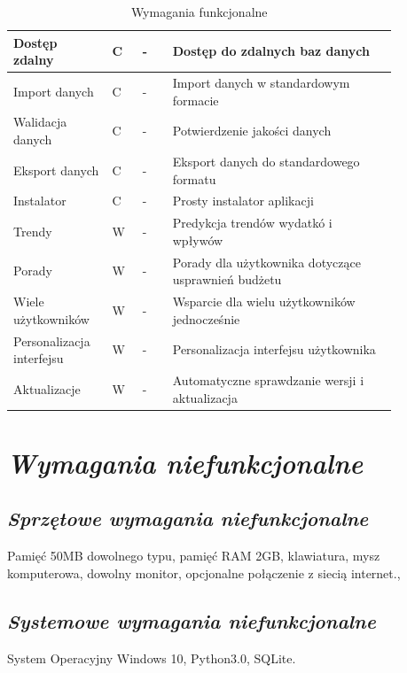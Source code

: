 \documentclass[a4paper,10pt]{report}
\newcommand{\customstylechapter}[1]{\large{\textit{#1}}}
\newcommand{\customstylesection}[1]{\textbf{\textit{#1}}}
\begin{document}
\begin{table}[h]
\begin{tabular}{|p{0.2\linewidth}|p{0.07\linewidth}|p{0.07\linewidth}|p{0.52\linewidth}|}
    \hline
    {Dostęp zdalny} & {C} & {-} & {Dostęp do zdalnych baz danych}\\
    \hline
    {Import danych} & {C} & {-} & {Import danych w standardowym formacie}\\
    \hline
    {Walidacja danych} & {C} & {-} & {Potwierdzenie jakości danych}\\
    \hline
    {Eksport danych} & {C} & {-} & {Eksport danych do standardowego formatu}\\
    \hline
    {Instalator} & {C} & {-} & {Prosty instalator aplikacji}\\
    \hline
    {Trendy} & {W} & {-} & {Predykcja trendów wydatkó i wpływów}\\
    \hline
    {Porady} & {W} & {-} & {Porady dla użytkownika dotyczące usprawnień budżetu}\\
    \hline
    {Wiele użytkowników} & {W} & {-} & {Wsparcie dla wielu użytkowników jednocześnie}\\
    \hline
    {Personalizacja interfejsu} & {W} & {-} & {Personalizacja interfejsu użytkownika}\\
    \hline
    {Aktualizacje} & {W} & {-} & {Automatyczne sprawdzanie wersji i aktualizacja}\\
    \hline
    \end{tabular}
    \caption{Wymagania funkcjonalne}
\end{table}

\chapter{\customstylechapter{Wymagania niefunkcjonalne}}
\section{\customstylesection{Sprzętowe wymagania niefunkcjonalne}}
{Pamięć 50MB dowolnego typu, pamięć RAM 2GB, klawiatura, mysz komputerowa, 
dowolny monitor, opcjonalne połączenie z siecią internet.},
\section{\customstylesection{Systemowe wymagania niefunkcjonalne}}
{System Operacyjny Windows 10, Python3.0, SQLite.}
\end{document}
